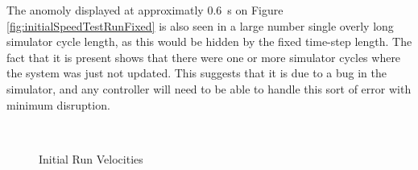 \documentclass[10pt]{article}
\begin{document}
The anomoly displayed at approximatly \SI{0.6}{\second} on Figure
\ref{fig:initialSpeedTestRunFixed} is also seen in a large number  single overly
long simulator cycle length, as this would be hidden by the fixed time-step
length. The fact that it is present shows that there were one or more simulator
cycles where the system was just not updated.  This suggests that it is due to a
bug in the simulator, and any controller will need to be able to handle this
sort of error with minimum disruption.

\begin{figure}
 \centering
 \\
 \caption{Initial Run Velocities}
 \label{fig:initialSpeedTestRun}
\end{figure}
\end{document}
